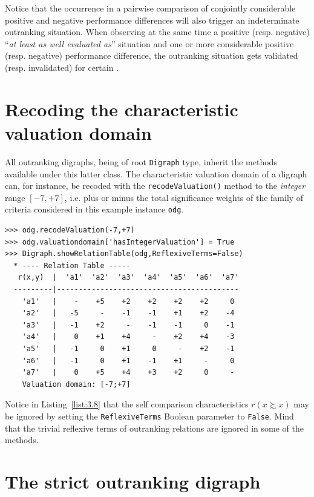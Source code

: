 Notice that the occurrence in a pairwise comparison of conjointly considerable positive and negative performance differences will also trigger an indeterminate outranking situation. When observing at the same time a positive (resp. negative) ``\emph{at least as well evaluated as}'' situation and one or more considerable positive (resp. negative) performance difference, the outranking situation gets validated (resp. invalidated) for certain \citep{BIS-2013}.

\section{Recoding the characteristic valuation domain}
\label{sec:3.4}

All outranking digraphs, being of root \texttt{Digraph} type, inherit the methods available under this latter class. The characteristic valuation domain of a digraph can, for instance, be recoded with the \texttt{recodeValuation()} method to the \emph{integer} range $[-7,+7]$, i.e. plus or minus the total significance weights of the family of criteria considered in this example instance \texttt{odg}.
\begin{lstlisting}[caption={Recoding the digraph valuation},label=list:3.8]
>>> odg.recodeValuation(-7,+7)
>>> odg.valuationdomain['hasIntegerValuation'] = True
>>> Digraph.showRelationTable(odg,ReflexiveTerms=False)
  * ---- Relation Table -----
   r(x,y)  |  'a1'  'a2'  'a3'  'a4'  'a5'  'a6'  'a7'	  
  ---------|------------------------------------------
    'a1'   |    -    +5    +2    +2    +2    +2     0	 
    'a2'   |   -5     -    -1    -1    +1    +2    -4	 
    'a3'   |   -1    +2     -    -1    -1     0    -1	 
    'a4'   |    0    +1    +4     -    +2    +4    -3	 
    'a5'   |   -1     0    +1     0     -    +2    -1	 
    'a6'   |   -1     0    +1    -1    +1     -     0	 
    'a7'   |    0    +5    +4    +3    +2     0     -	 
    Valuation domain: [-7;+7]
\end{lstlisting}

Notice in Listing~\vref{list:3.8} that the self comparison characteristics $r(x \succsim x)$ may be ignored by setting the \texttt{ReflexiveTerms} Boolean parameter to \texttt{False}. Mind that the trivial reflexive terms of outranking relations are ignored in some of the \Digraph methods. 

\section{The strict outranking digraph}
\label{sec:3.5}

